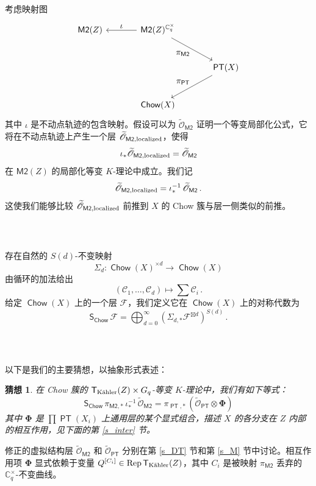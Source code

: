 \documentclass[12pt]{article}
\DeclareMathOperator{\Chow}{\mathsf{Chow}}
\DeclareMathOperator{\PT}{\mathsf{PT}}
\DeclareMathOperator{\Rep}{Rep}
\newcommand{\cC}{\mathscr{C}}
\newcommand{\cF}{\mathscr{F}}
\newcommand{\Ct}{\mathbb{C}^{\times}}
\newcommand{\Cq}{\Ct_q}
\newcommand{\MM}{\textsf{M2}}
\newcommand{\tO}{\widetilde{\mathscr{O}}}
\newcommand{\bT}{\mathsf{T}}
\newcommand{\bS}{\mathsf{S}}
\newcommand{\TK}{\bT_{\textup{K\"ahler}}}
\newcommand{\bPhi}{\boldsymbol{\Phi}}
\newtheorem{Conjecture}{猜想}
\theoremstyle{definition}
\begin{document}
考虑映射图
$$
\begin{tikzcd}[column sep=large,row sep=large]
\MM(Z) & \MM(Z)^{\Cq} \arrow[l, "\displaystyle{\iota}"'] \arrow[rd, "\displaystyle{\pi_{\MM}}"'] \\
& & \PT(X) \arrow[ld, "\displaystyle{\pi_{\PT}}"'] \\
& \Chow(X)
\end{tikzcd}
$$
其中 $\iota$ 是不动点轨迹的包含映射。假设可以为 $\tO_{\MM}$ 证明一个等变局部化公式，它将在不动点轨迹上产生一个层 $\tO_{\MM,\textup{localized}}$，使得
$$
\iota_* \tO_{\MM,\textup{localized}} =  \tO_{\MM}
$$
在 $\MM(Z)$ 的局部化等变 $K$-理论中成立。我们记
$$
 \tO_{\MM,\textup{localized}} = \iota_*^{-1} \,  \tO_{\MM} \,.
$$
这使我们能够比较 $\tO_{\MM,\textup{localized}}$ 前推到 $X$ 的 Chow 簇与层一侧类似的前推。

\subsubsection{\ }
存在自然的 $S(d)$-不变映射
$$
\Sigma_d: \Chow(X)^{\times d} \to \Chow(X)
$$
由循环的加法给出
$$
\left(\cC_1,\dots,\cC_d\right) \mapsto \sum \cC_i \,.
$$
给定 $\Chow(X)$ 上的一个层 $\cF$，我们定义它在 $\Chow(X)$ 上的对称代数为
$$
\bS_{\Chow}\,  \cF = \bigoplus_{d=0}^{\infty} \left( \Sigma_{d,*} \cF^{\boxtimes d}
\right)^{S(d)} \,.
$$

\subsubsection{\ }

以下是我们的主要猜想，以抽象形式表述：

\begin{Conjecture}\label{sconj1} 在 Chow 簇的 $\TK(Z) \times G_q$-等变 $K$-理论中，我们有如下等式：
\begin{equation}
\bS_{\Chow}\,  \pi_{\MM,*} \, \iota_*^{-1} \, \tO_{\MM} = \pi_{\PT,*} \,
\left(
\tO_{\PT} \otimes \bPhi \right)\label{conj1}
\end{equation}
其中 $\bPhi$ 是 $\prod \PT(X_i)$ 上通用层的某个显式组合，描述 $X$ 的各分支在 $Z$ 内部的相互作用，见下面的第 \ref{s_inter} 节。
\end{Conjecture}

修正的虚拟结构层 $\tO_{\MM}$ 和 $\tO_{\PT}$ 分别在第 \ref{s_DT} 节和第 \ref{s_M} 节中讨论。相互作用项 $\bPhi$ 显式依赖于变量 $Q^{[C_i]} \in \Rep \TK(Z)$，其中 $C_i$ 是被映射 $\pi_{\MM}$ 丢弃的 $\Cq$-不变曲线。

\subsubsection{\ }
\end{document}
